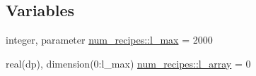 \subsection*{Variables}
\begin{DoxyCompactItemize}
\item 
integer, parameter \hyperlink{namespacenum__recipes_a5e2fe25448fc2af7b6548e8a6aee6b98}{num\+\_\+recipes\+::l\+\_\+max} = 2000
\item 
real(dp), dimension(0\+:l\+\_\+max) \hyperlink{namespacenum__recipes_ac255de146726ccb211ee223424f8be21}{num\+\_\+recipes\+::l\+\_\+array} = 0
\end{DoxyCompactItemize}
